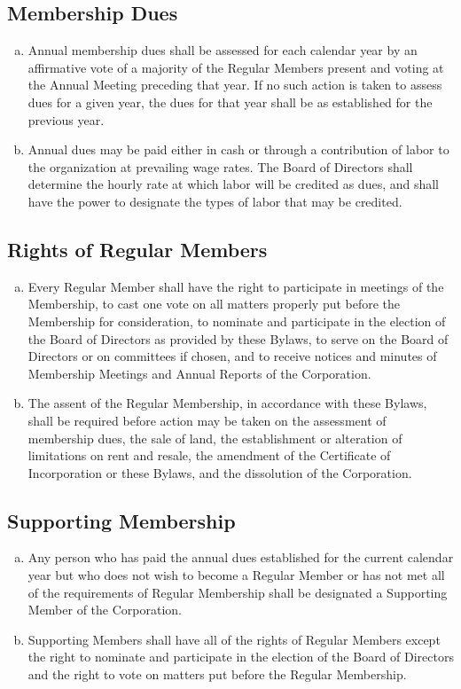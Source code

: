 \subsection{Membership Dues}
\begin{enumerate}[a.]
\item Annual membership dues shall be assessed for each calendar year
  by an affirmative vote of a majority of the Regular Members present
  and voting at the Annual Meeting preceding that year. If no such
  action is taken to assess dues for a given year, the dues for that
  year shall be as established for the previous year.
\item Annual dues may be paid either in cash or through a contribution
  of labor to the organization at prevailing wage rates. The Board of
  Directors shall determine the hourly rate at which labor will be
  credited as dues, and shall have the power to designate the types of
  labor that may be credited.
\end{enumerate}
  
\subsection{Rights of Regular Members}
\begin{enumerate}[a.]
\item Every Regular Member shall have the right to participate in
  meetings of the Membership, to cast one vote on all matters properly
  put before the Membership for consideration, to nominate and
  participate in the election of the Board of Directors as provided by
  these Bylaws, to serve on the Board of Directors or on committees if
  chosen, and to receive notices and minutes of Membership Meetings
  and Annual Reports of the Corporation.
\item The assent of the Regular Membership, in accordance with these
  Bylaws, shall be required before action may be taken on the
  assessment of membership dues, the sale of land, the establishment
  or alteration of limitations on rent and resale, the amendment of
  the Certificate of Incorporation or these Bylaws, and the
  dissolution of the Corporation.
\end{enumerate}
  
\subsection{Supporting Membership}
\begin{enumerate}[a.]
\item Any person who has paid the annual dues established for the
  current calendar year but who does not wish to become a Regular
  Member or has not met all of the requirements of Regular Membership
  shall be designated a Supporting Member of the Corporation.
\item Supporting Members shall have all of the rights of Regular
  Members except the right to nominate and participate in the election
  of the Board of Directors and the right to vote on matters put
  before the Regular Membership.
\end{enumerate}


